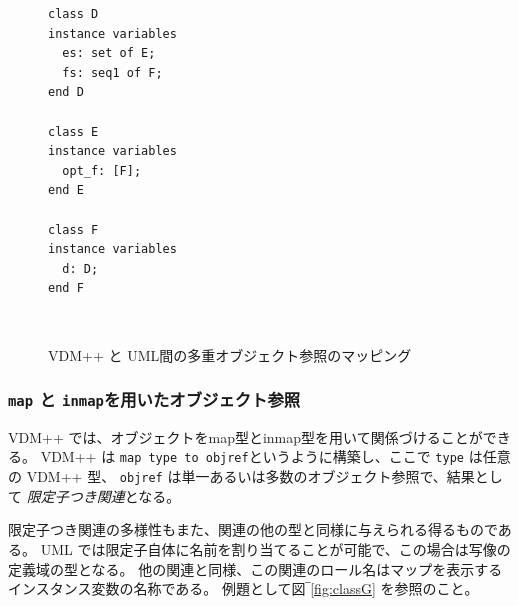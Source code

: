 \documentclass[\pformat,12pt]{jarticle}
\newcommand{\vdmpp}{VDM++}
\begin{document}
\begin{figure}[htb]
\begin{center}
\hspace{-2cm}\begin{minipage}[t]{2in}
\begin{verbatim}
class D  
instance variables  
  es: set of E;  
  fs: seq1 of F;  
end D  
  
class E  
instance variables  
  opt_f: [F];  
end E  
  
class F  
instance variables  
  d: D;  
end F  
\end{verbatim}
\end{minipage} \ \
\begin{minipage}[t]{2in}
\vspace{1cm}
\end{minipage}
\caption{\vdmpp{} と UML間の多重オブジェクト参照のマッピング　\label{fig:classD}}
\end{center}
\end{figure}

\subsubsection*{ {\tt map} と {\tt inmap}を用いたオブジェクト参照}


 \vdmpp{} では、オブジェクトをmap型とinmap型を用いて関係づけることができる。
\vdmpp{} は {\tt map type to objref}というように構築し、ここで {\tt  type} は任意の \vdmpp{} 型、 {\tt objref} は単一あるいは多数のオブジェクト参照で、結果として {\it 限定子つき関連}となる。

限定子つき関連の多様性もまた、関連の他の型と同様に与えられる得るものである。
 UML では限定子自体に名前を割り当てることが可能で、この場合は写像の定義域の型となる。
他の関連と同様、この関連のロール名はマップを表示するインスタンス変数の名称である。
例題として図‾\ref{fig:classG} を参照のこと。
\end{document}
